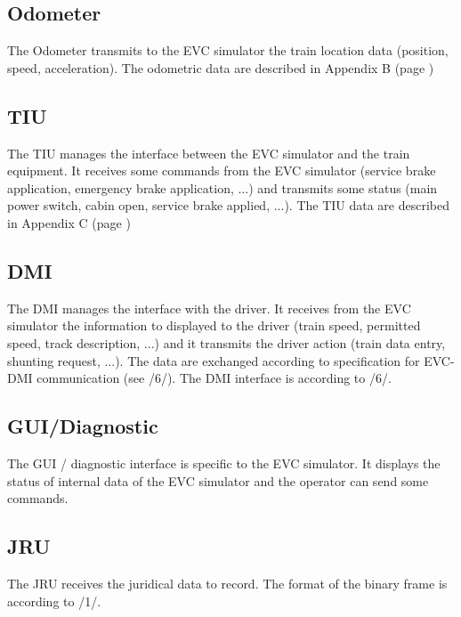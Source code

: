 \documentclass[nocc]{template/openetcs_report}
\begin{document}
\subsection{Odometer}
The Odometer transmits to the EVC simulator the train location data (position, speed, acceleration). The odometric data are described in Appendix B (page \pageref{odometric_data})
\subsection{TIU}
The TIU manages the interface between the EVC simulator and the train equipment. It receives some commands from the EVC simulator (service brake application, emergency brake application, ...) and transmits some status (main power switch, cabin open, service brake applied, ...). The TIU data are described in  Appendix C (page \pageref{tiu_data})
\subsection{DMI}
The DMI manages the interface with the driver. It receives from the EVC simulator the information to displayed to the driver (train speed, permitted speed, track description, ...) and it transmits the driver action (train data entry, shunting request, ...).
The data are exchanged according to specification for EVC-DMI communication (see /6/).
The DMI interface is according to /6/.
\subsection{GUI/Diagnostic}
The GUI / diagnostic interface is specific to the EVC simulator. It displays the status of internal data of the EVC simulator and the operator can send some commands.
\subsection{JRU}
The JRU receives the juridical data to record. The format of the binary frame is according to /1/.
\end{document}
